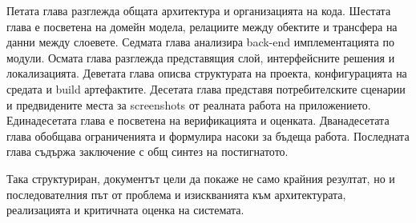 Петата глава разглежда общата архитектура и организацията на кода. Шестата глава е посветена на домейн модела, релациите между обектите и трансфера на данни между слоевете. Седмата глава анализира back-end имплементацията по модули. Осмата глава разглежда представящия слой, интерфейсните решения и локализацията. Деветата глава описва структурата на проекта, конфигурацията на средата и build артефактите. Десетата глава представя потребителските сценарии и предвидените места за screenshots от реалната работа на приложението. Единадесетата глава е посветена на верификацията и оценката. Дванадесетата глава обобщава ограниченията и формулира насоки за бъдеща работа. Последната глава съдържа заключение с общ синтез на постигнатото.

Така структуриран, документът цели да покаже не само крайния резултат, но и последователния път от проблема и изискванията към архитектурата, реализацията и критичната оценка на системата.
